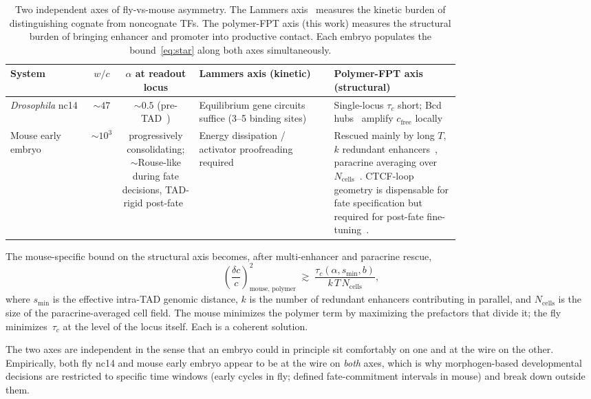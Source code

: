 \documentclass[11pt]{article}
\begin{document}
\begin{table}[h]
\centering
\small
\begin{tabular}{p{0.18\linewidth}cc p{0.30\linewidth} p{0.28\linewidth}}
\toprule
System & $w/c$ & $\alpha$ at readout locus & Lammers axis (kinetic) & Polymer-FPT axis (structural) \\
\midrule
\textit{Drosophila} nc14 &
$\sim 47$ &
$\sim 0.5$ (pre-TAD~\cite{Hug2017,Ogiyama2018}) &
Equilibrium gene circuits suffice (3--5 binding sites) &
Single-locus $\tau_c$ short; Bcd hubs~\cite{Mir2017,Mir2018} amplify
$c_{\mathrm{free}}$ locally \\
\addlinespace
Mouse early embryo &
$\sim 10^{3}$ &
progressively consolidating; $\sim$Rouse-like during fate decisions,
TAD-rigid post-fate~\cite{Du2017,Ke2017,Flyamer2017,Saiz2026} &
Energy dissipation / activator proofreading required &
Rescued mainly by long $T$, $k$ redundant enhancers~\cite{Osterwalder2018},
paracrine averaging over $N_{\mathrm{cells}}$~\cite{Etoc2016,Saiz2016}.
CTCF-loop geometry is dispensable for fate specification but required for
post-fate fine-tuning~\cite{Saiz2026,Rao2017,Hsieh2022}. \\
\bottomrule
\end{tabular}
\caption{Two independent axes of fly-vs-mouse asymmetry. The Lammers
axis~\cite{Lammers2023} measures the kinetic burden of distinguishing
cognate from noncognate TFs. The polymer-FPT axis (this work) measures
the structural burden of bringing enhancer and promoter into productive
contact. Each embryo populates the bound~\eqref{eq:star} along both axes
simultaneously.}
\label{tab:two_axes}
\end{table}

The mouse-specific bound on the structural axis becomes, after
multi-enhancer and paracrine rescue,
\begin{equation}
  \left(\frac{\delta c}{c}\right)^{\!2}_{\!\text{mouse, polymer}}
  \;\gtrsim\;
  \frac{\tau_c(\alpha,s_{\min},b)}{k\,T\,N_{\mathrm{cells}}},
  \label{eq:star_mouse}
\end{equation}
where $s_{\min}$ is the effective intra-TAD genomic distance, $k$ is the
number of redundant enhancers contributing in parallel, and
$N_{\mathrm{cells}}$ is the size of the paracrine-averaged cell field. The
mouse minimizes the polymer term by maximizing the prefactors that divide
it; the fly minimizes~$\tau_c$ at the level of the locus itself. Each is a
coherent solution.

The two axes are independent in the sense that an embryo could in principle
sit comfortably on one and at the wire on the other. Empirically, both fly
nc14 and mouse early embryo appear to be at the wire on \emph{both} axes,
which is why morphogen-based developmental decisions are restricted to
specific time windows (early cycles in fly; defined fate-commitment
intervals in mouse) and break down outside them.
\end{document}
